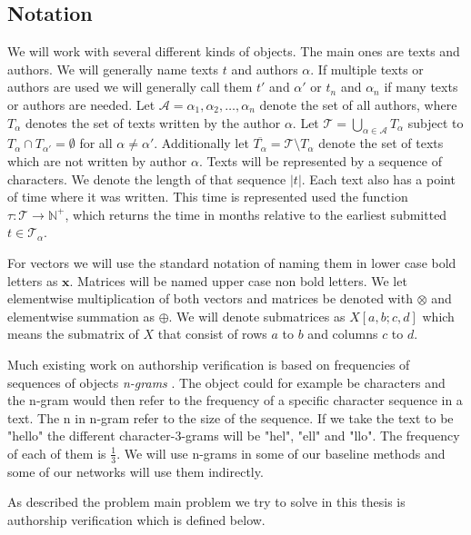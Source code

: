 \subsection{Notation} \label{subsec:notation}

We will work with several different kinds of objects. The main ones are texts
and authors. We will generally name texts $t$ and authors $\alpha$. If multiple
texts or authors are used we will generally call them $t'$ and $\alpha'$ or
$t_n$ and $\alpha_n$ if many texts or authors are needed. Let $\mathcal{A} =
{\alpha_1, \alpha_2, \dots, \alpha_n}$ denote the set of all authors, where
$T_\alpha$ denotes the set of texts written by the author $\alpha$. Let
$\mathcal{T} = \bigcup_{\alpha \in \mathcal{A}} T_\alpha$ subject to $T_{\alpha}
\cap T_{\alpha'} = \emptyset$ for all $\alpha \neq \alpha'$. Additionally
let $\overline{T_\alpha} = \mathcal{T} \setminus T_\alpha$ denote the set of
texts which are not written by author $\alpha$. Texts will be represented by a
sequence of characters. We denote the length of that sequence $|t|$. Each text
also has a point of time where it was written. This time is represented used the
function $\tau \colon \mathcal{T} \rightarrow \mathbb{N}^+$, which returns the
time in months relative to the earliest submitted $t \in \mathcal{T_\alpha}$.

For vectors we will use the standard notation of naming them in lower case bold
letters as $\mathbf{x}$. Matrices will be named upper case non bold letters.
We let elementwise multiplication of both vectors and matrices be denoted with
$\otimes$ and elementwise summation as $\oplus$. We will denote submatrices as
$X[a,b;c,d]$ which means the submatrix of $X$ that consist of rows $a$ to $b$
and columns $c$ to $d$.

Much existing work on authorship verification is based on frequencies of
sequences of objects \textit{n-grams} \citep{stamatos2009}. The object could
for example be characters and the n-gram would then refer to the frequency of a
specific character sequence in a text. The n in n-gram refer to the size of the
sequence. If we take the text to be "hello" the different character-3-grams will
be "hel", "ell" and "llo". The frequency of each of them is $\frac{1}{3}$. We
will use n-grams in some of our baseline methods and some of our networks will
use them indirectly.



As described the problem main problem we try to solve in this thesis is
authorship verification which is defined below.

